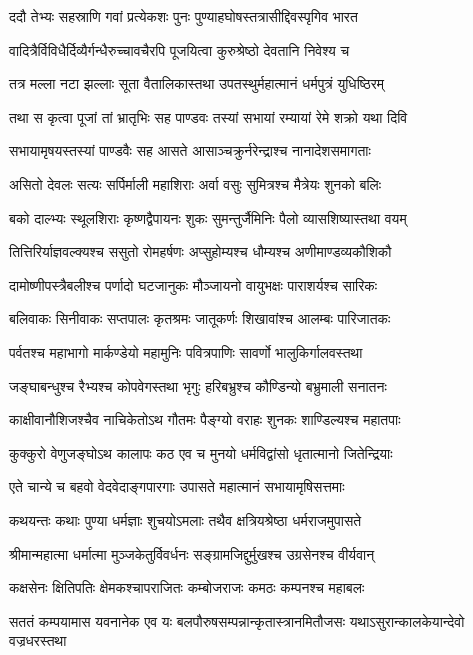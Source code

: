 \twolineshloka
{ददौ तेभ्यः सहस्राणि गवां प्रत्येकशः पुनः}
{पुण्याहघोषस्तत्रासीद्दिवस्पृगिव भारत}


\twolineshloka
{वादित्रैर्विविधैर्दिव्यैर्गन्धैरुच्चावचैरपि}
{पूजयित्वा कुरुश्रेष्ठो देवतानि निवेश्य च}


\twolineshloka
{तत्र मल्ला नटा झल्लाः सूता वैतालिकास्तथा}
{उपतस्थुर्महात्मानं धर्मपुत्रं युधिष्ठिरम्}


\twolineshloka
{तथा स कृत्वा पूजां तां भ्रातृभिः सह पाण्डवः}
{तस्यां सभायां रम्यायां रेमे शक्रो यथा दिवि}


\twolineshloka
{सभायामृषयस्तस्यां पाण्डवैः सह आसते}
{आसाञ्चक्रुर्नरेन्द्राश्च नानादेशसमागताः}


\twolineshloka
{असितो देवलः सत्यः सर्पिर्माली महाशिराः}
{अर्वा वसुः सुमित्रश्च मैत्रेयः शुनको बलिः}


\twolineshloka
{बको दाल्भ्यः स्थूलशिराः कृष्णद्वैपायनः शुकः}
{सुमन्तुर्जैमिनिः पैलो व्यासशिष्यास्तथा वयम्}


\twolineshloka
{तित्तिरिर्याज्ञवल्क्यश्च ससुतो रोमहर्षणः}
{अप्सुहोम्यश्च धौम्यश्च अणीमाण्डव्यकौशिकौ}


\twolineshloka
{दामोष्णीपस्त्रैबलीश्च पर्णादो घटजानुकः}
{मौञ्जायनो वायुभक्षः पाराशर्यश्च सारिकः}


\twolineshloka
{बलिवाकः सिनीवाकः सप्तपालः कृतश्रमः}
{जातूकर्णः शिखावांश्च आलम्बः पारिजातकः}


\twolineshloka
{पर्वतश्च महाभागो मार्कण्डेयो महामुनिः}
{पवित्रपाणिः सावर्णो भालुकिर्गालवस्तथा}


\twolineshloka
{जङ्घाबन्धुश्च रैभ्यश्च कोपवेगस्तथा भृगुः}
{हरिबभ्रुश्च कौण्डिन्यो बभ्रुमाली सनातनः}


\twolineshloka
{काक्षीवानौशिजश्चैव नाचिकेतोऽथ गौतमः}
{पैङ्ग्यो वराहः शुनकः शाण्डिल्यश्च महातपाः}


\twolineshloka
{कुक्कुरो वेणुजङ्घोऽथ कालापः कठ एव च}
{मुनयो धर्मविद्वांसो धृतात्मानो जितेन्द्रियाः}


\twolineshloka
{एते चान्ये च बहवो वेदवेदाङ्गपारगाः}
{उपासते महात्मानं सभायामृषिसत्तमाः}


\twolineshloka
{कथयन्तः कथाः पुण्या धर्मज्ञाः शुचयोऽमलाः}
{तथैव क्षत्रियश्रेष्ठा धर्मराजमुपासते}


\threelineshloka
{श्रीमान्महात्मा धर्मात्मा मुञ्जकेतुर्विवर्धनः}
{सङ्ग्रामजिद्दुर्मुखश्च उग्रसेनश्च वीर्यवान्}
{}


\twolineshloka
{कक्षसेनः क्षितिपतिः क्षेमकश्चापराजितः}
{कम्बोजराजः कमठः कम्पनश्च महाबलः}


\threelineshloka
{सततं कम्पयामास यवनानेक एव यः}
{बलपौरुषसम्पन्नान्कृतास्त्रानमितौजसः}
{यथाऽसुरान्कालकेयान्देवो वज्रधरस्तथा}


